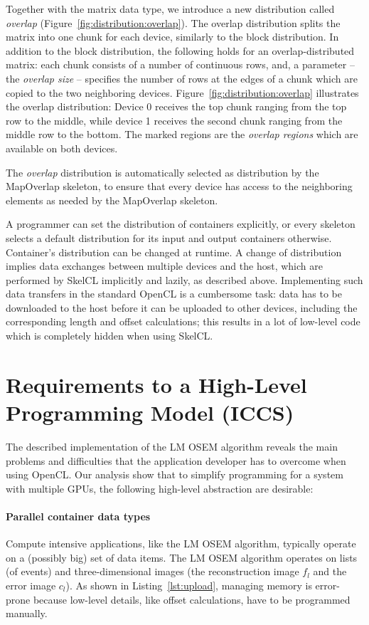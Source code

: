 Together with the matrix data type, we introduce a new distribution called \emph{overlap} (Figure~\ref{fig:distribution:overlap}).
The overlap distribution splits the matrix into one chunk for each device, similarly to the block distribution.
In addition to the block distribution, the following holds for an overlap-distributed matrix:
each chunk consists of a number of continuous rows, and, a parameter -- the \emph{overlap size} -- specifies the number of rows at the edges of a chunk which are copied to the two neighboring devices.
Figure~\ref{fig:distribution:overlap} illustrates the overlap distribution:
Device 0 receives the top chunk ranging from the top row to the middle, while device 1 receives the second chunk ranging from the middle row to the bottom.
The marked regions are the \emph{overlap regions} which are available on both devices.

The \emph{overlap} distribution is automatically selected as distribution by the MapOverlap skeleton, to ensure that every device has access to the neighboring elements as needed by the MapOverlap skeleton.

A programmer can set the distribution of containers explicitly, or every skeleton selects a default distribution for its input and output containers otherwise.
Container's distribution can be changed at runtime.
A change of distribution implies data exchanges between multiple devices and the host, which are performed by SkelCL implicitly and lazily, as described above.
Implementing such data transfers in the standard OpenCL is a cumbersome task:
data has to be downloaded to the host before it can be uploaded to other devices, including the corresponding length and offset calculations;
this results in a lot of low-level code which is completely hidden when using SkelCL.




\section{Requirements to a High-Level Programming Model (ICCS)}
The described implementation of the LM OSEM algorithm reveals the main problems and difficulties that the application developer has to overcome when using OpenCL.
Our analysis show that to simplify programming for a system with multiple GPUs, the following high-level abstraction are desirable:

\paragraph{Parallel container data types}
Compute intensive applications, like the LM OSEM algorithm, typically operate on a (possibly big) set of data items.
The LM OSEM algorithm operates on lists (of events) and three-dimensional images (the reconstruction image $f_l$ and the error image $c_l$).
As shown in Listing~\ref{lst:upload}, managing memory is error-prone because low-level details, like offset calculations, have to be programmed manually.

